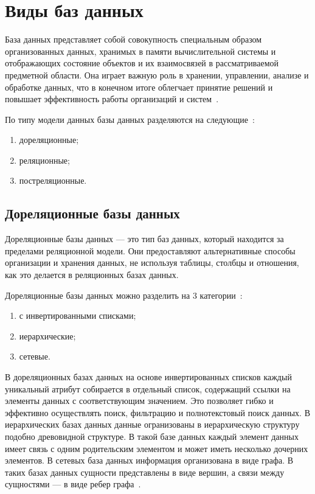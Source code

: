 \section{Виды баз данных}

База данных представляет собой совокупность специальным образом организованных данных, хранимых в памяти вычислительной системы и отображающих состояние объектов и их взаимосвязей в рассматриваемой предметной области. Она играет важную роль в хранении, управлении, анализе и обработке данных, что в конечном итоге облегчает принятие решений и повышает эффективность работы организаций и систем~\cite{serg}.

По типу модели данных базы данных разделяются на следующие~\cite{ucheb}:
\begin{enumerate}[label=\arabic*)]
	\item дореляционные;
	\item реляционные;
	\item постреляционные.
\end{enumerate}

\subsection{Дореляционные базы данных}

Дореляционные базы данных --- это тип баз данных, который находится за пределами реляционной модели. Они предоставляют альтернативные способы организации и хранения данных, не используя таблицы, столбцы и отношения, как это делается в реляционных базах данных.

Дореляционные базы данных можно разделить на 3 категории~\cite{deit}:
\begin{enumerate}[label=\arabic*)]
	\item с инвертированными списками;
	\item иерархические;
	\item сетевые.
\end{enumerate}

В дореляционных базах данных на основе инвертированных списков каждый уникальный атрибут собирается в отдельный список, содержащий ссылки на элементы данных с соответствующим значением. Это позволяет гибко и эффективно осуществлять поиск, фильтрацию и полнотекстовый поиск данных. 
В иерархических базах данных данные огранизованы в иерархическую структуру подобно древовидной структуре. В такой базе данных каждый элемент данных имеет связь с одним родительским элементом и может иметь несколько дочерних элементов.
В сетевых база данных информация организована в виде графа. В таких базах данных сущности представлены в виде вершин, а связи между сущностями --- в виде ребер графа~\cite{gavr}.

